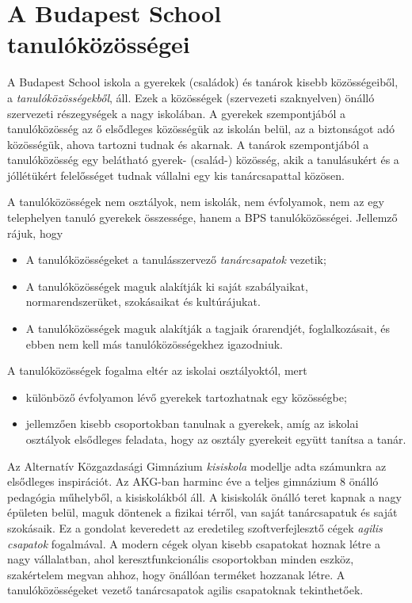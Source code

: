 \hypertarget{a-budapest-school-tanulokozossegei}{%
\section{A Budapest School
tanulóközösségei}\label{a-budapest-school-tanulokozossegei}}

A Budapest School iskola a gyerekek (családok) és tanárok kisebb
közösségeiből, a \emph{tanulóközösségekből}, áll. Ezek a közösségek
(szervezeti szaknyelven) önálló szervezeti részegységek a nagy
iskolában. A gyerekek szempontjából a tanulóközösség az ő elsődleges
közösségük az iskolán belül, az a biztonságot adó közösségük, ahova
tartozni tudnak és akarnak. A tanárok szempontjából a tanulóközösség egy
belátható gyerek- (család-) közösség, akik a tanulásukért és a jóllétükért
felelősséget tudnak vállalni egy kis tanárcsapattal közösen.

A tanulóközösségek nem osztályok, nem iskolák, nem évfolyamok, nem az
egy telephelyen tanuló gyerekek összessége, hanem a BPS
tanulóközösségei. Jellemző rájuk, hogy

\begin{itemize}
\tightlist
\item
  A tanulóközösségeket a tanulásszervező \emph{tanárcsapatok} vezetik;
\item
  A tanulóközösségek maguk alakítják ki saját szabályaikat,
  normarendszerüket, szokásaikat és kultúrájukat.
\item
  A tanulóközösségek maguk alakítják a tagjaik órarendjét,
  foglalkozásait, és ebben nem kell más tanulóközösségekhez igazodniuk.
\end{itemize}

A tanulóközösségek fogalma eltér az iskolai osztályoktól, mert

\begin{itemize}
\tightlist
\item
  különböző évfolyamon lévő gyerekek tartozhatnak egy közösségbe;
\item
  jellemzően kisebb csoportokban tanulnak a gyerekek, amíg az iskolai
  osztályok elsődleges feladata, hogy az osztály gyerekeit együtt
  tanítsa a tanár.
\end{itemize}

Az Alternatív Közgazdasági Gimnázium \emph{kisiskola} modellje adta
számunkra az elsődleges inspirációt. Az AKG-ban harminc éve a teljes
gimnázium 8 önálló pedagógia műhelyből, a kisiskolákból áll. A kisiskolák
önálló teret kapnak a nagy épületen belül, maguk döntenek a fizikai
térről, van saját tanárcsapatuk és saját szokásaik. Ez a gondolat
keveredett az eredetileg szoftverfejlesztő cégek \emph{agilis csapatok}
fogalmával. A modern cégek olyan kisebb csapatokat hoznak létre a nagy
vállalatban, ahol keresztfunkcionális csoportokban minden eszköz,
szakértelem megvan ahhoz, hogy önállóan terméket hozzanak létre. A
tanulóközösségeket vezető tanárcsapatok agilis csapatoknak tekinthetőek.

